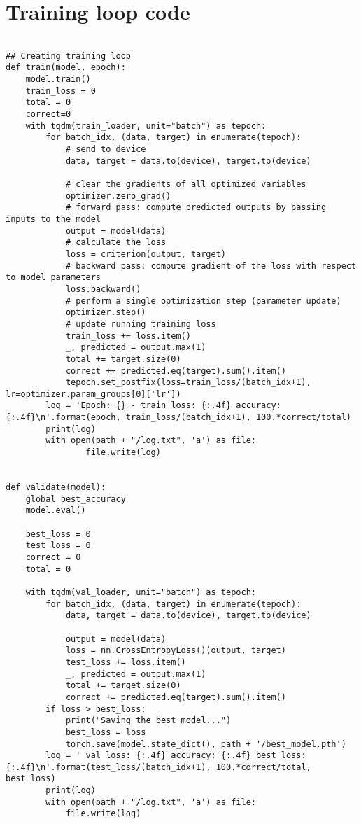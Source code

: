 \documentclass{article} %
\begin{document}
\section{Training loop code}
\label{app:trainingLoop}
\begin{lstlisting}

## Creating training loop
def train(model, epoch):
    model.train()
    train_loss = 0
    total = 0
    correct=0
    with tqdm(train_loader, unit="batch") as tepoch:
        for batch_idx, (data, target) in enumerate(tepoch):
            # send to device
            data, target = data.to(device), target.to(device)
    
            # clear the gradients of all optimized variables
            optimizer.zero_grad()
            # forward pass: compute predicted outputs by passing inputs to the model
            output = model(data)
            # calculate the loss
            loss = criterion(output, target)
            # backward pass: compute gradient of the loss with respect to model parameters
            loss.backward()
            # perform a single optimization step (parameter update)
            optimizer.step()
            # update running training loss
            train_loss += loss.item()
            _, predicted = output.max(1)
            total += target.size(0)
            correct += predicted.eq(target).sum().item()
            tepoch.set_postfix(loss=train_loss/(batch_idx+1), lr=optimizer.param_groups[0]['lr'])
        log = 'Epoch: {} - train loss: {:.4f} accuracy: {:.4f}\n'.format(epoch, train_loss/(batch_idx+1), 100.*correct/total)
        print(log)
        with open(path + "/log.txt", 'a') as file:
                file.write(log)


def validate(model):
    global best_accuracy
    model.eval()

    best_loss = 0
    test_loss = 0
    correct = 0
    total = 0

    with tqdm(val_loader, unit="batch") as tepoch:
        for batch_idx, (data, target) in enumerate(tepoch):
            data, target = data.to(device), target.to(device)
    
            output = model(data)
            loss = nn.CrossEntropyLoss()(output, target)
            test_loss += loss.item()
            _, predicted = output.max(1)
            total += target.size(0)
            correct += predicted.eq(target).sum().item()
        if loss > best_loss:
            print("Saving the best model...")
            best_loss = loss
            torch.save(model.state_dict(), path + '/best_model.pth')
        log = ' val loss: {:.4f} accuracy: {:.4f} best_loss: {:.4f}\n'.format(test_loss/(batch_idx+1), 100.*correct/total, best_loss)
        print(log)
        with open(path + "/log.txt", 'a') as file:
            file.write(log)        


\end{lstlisting}
\end{document}
